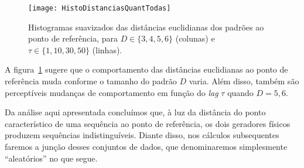 %
%
%

\begin{figure}[hbt]
\centering
\texttt{[image: HistoDistanciasQuantTodas]}
\caption{Histogramas suavizados das distâncias euclidianas dos padrões ao ponto de referência, para $D\in\{3,4,5,6\}$ (colunas) e $\tau\in\{1,10,30,50\}$ (linhas).}\label{Fig:HistoDistanciasQuantTodas}
\end{figure}

A figura~\ref{Fig:HistoDistanciasQuantTodas} sugere que o comportamento das distâncias euclidianas ao ponto de referência muda conforme o tamanho do padrão $D$ varia.
Além disso, também são perceptíveis mudanças de comportamento em função do \textit{lag} $\tau$ quando $D=5,6$.

Da análise aqui apresentada concluímos que, à luz da distância do ponto característico de uma sequência ao ponto de referência, os dois geradores físicos produzem sequências indistinguíveis.
Diante disso, nos cálculos subsequentes faremos a junção desses conjuntos de dados, que denominaremos simplesmente ``aleatórios'' no que segue.

